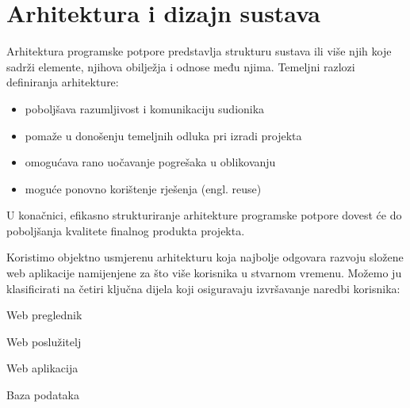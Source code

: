 \chapter{Arhitektura i dizajn sustava}

		Arhitektura programske potpore predstavlja strukturu sustava ili više njih koje sadrži elemente, njihova obilježja i odnose među njima. Temeljni razlozi definiranja arhitekture:		

	\begin{itemize}
		\item 	{poboljšava razumljivost i komunikaciju sudionika}
		\item 	{pomaže u donošenju temeljnih odluka pri izradi projekta}
		\item 	{omogućava rano uočavanje pogrešaka u oblikovanju}		
		\item         {moguće ponovno korištenje rješenja (engl. reuse)}
	\end{itemize}

	U konačnici, efikasno strukturiranje arhitekture programske potpore dovest će do poboljšanja kvalitete finalnog produkta projekta.

	\vspace{10mm} %

	Koristimo objektno usmjerenu arhitekturu koja najbolje odgovara razvoju složene web aplikacije namijenjene za što više korisnika u stvarnom vremenu. Možemo ju klasificirati na četiri ključna dijela koji osiguravaju izvršavanje naredbi korisnika: 
		
	\begin{packed_enum}
		\item 	{Web preglednik}
		\item 	{Web poslužitelj}
		\item 	{Web aplikacija}
		\item 	{Baza podataka}
	\end{packed_enum}			

